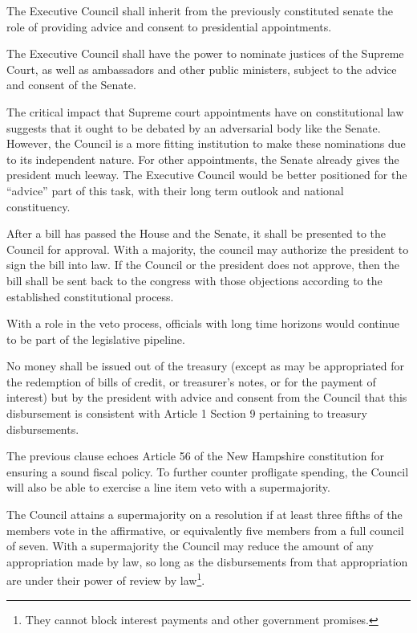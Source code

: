 \documentclass{article}
\newcommand{\quotes}[1]{``#1''}
\begin{document}
\begin{quoting}
The Executive Council shall inherit from the previously constituted senate the role of providing advice and consent to presidential appointments.

The Executive Council shall have the power to nominate justices of the Supreme Court, as well as ambassadors and other public ministers, subject to the advice and consent of the Senate.
\end{quoting}

The critical impact that Supreme court appointments have on constitutional law suggests that it ought to be debated by an adversarial body like the Senate. However, the Council is a more fitting institution to make these nominations due to its independent nature. For other appointments, the Senate already gives the president much leeway. The Executive Council would be better positioned for the \quotes{advice} part of this task, with their long term outlook and national constituency.

\begin{quoting}
After a bill has passed the House and the Senate, it shall be presented to the Council for approval. With a majority, the council may authorize the president to sign the bill into law. If the Council or the president does not approve, then the bill shall be sent back to the congress with those objections according to the established constitutional process.
\end{quoting}

With a role in the veto process, officials with long time horizons would continue to be part of the legislative pipeline.

\begin{quoting}
No money shall be issued out of the treasury (except as may be appropriated for the redemption of bills of credit, or treasurer's notes, or for the payment of interest) but by the president with advice and consent from the Council that this disbursement is consistent with Article 1 Section 9 pertaining to treasury disbursements.
\end{quoting}

The previous clause echoes Article 56 of the New Hampshire constitution\cite{New Hampshire Constitution} for ensuring a sound fiscal policy. To further counter profligate spending, the Council will also be able to exercise a line item veto with a supermajority.

\begin{quoting}
The Council attains a supermajority on a resolution if at least three fifths of the members vote in the affirmative, or equivalently five members from a full council of seven. With a supermajority the Council may reduce the amount of any appropriation made by law, so long as the disbursements from that appropriation are under their power of review by law\footnote{They cannot block interest payments and other government promises.}.
\end{quoting}
\end{document}
